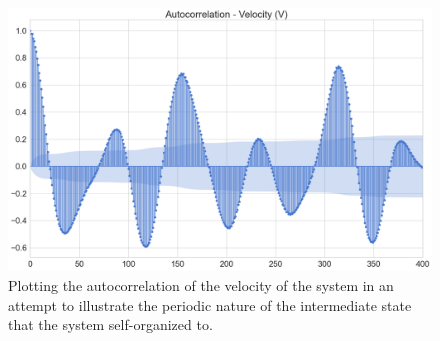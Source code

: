 \begin{figure}[H]
    \centering
    \includegraphics[width=\linewidth]{Images/Section 4/Experiment 3/Autocorrelation.pdf}
    \caption{Plotting the autocorrelation of the velocity of the system in an attempt to illustrate the periodic nature of the intermediate state that the system self-organized to.}
    \label{fig:Experiment-3.3}
\end{figure}


